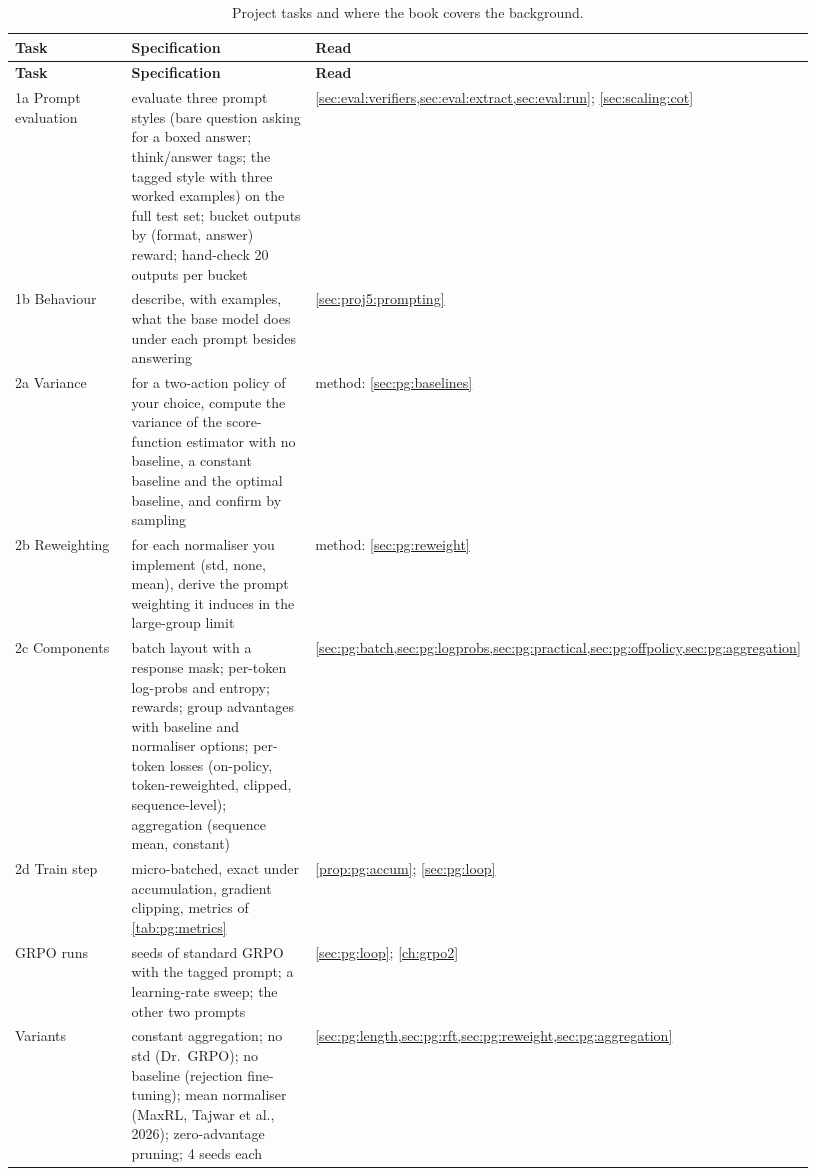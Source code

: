{\small
\begin{longtable}{@{}>{\raggedright\arraybackslash}p{0.22\linewidth}>{\raggedright\arraybackslash}p{0.44\linewidth}>{\raggedright\arraybackslash}p{0.27\linewidth}@{}}
\caption{Project tasks and where the book covers the background.}\label{tab:proj5:map}\\
\toprule
\textbf{Task} & \textbf{Specification} & \textbf{Read}\\
\midrule\endfirsthead
\toprule
\textbf{Task} & \textbf{Specification} & \textbf{Read}\\
\midrule\endhead
1a Prompt evaluation & evaluate three prompt styles (bare question asking for a boxed answer; think/answer tags; the tagged style with three worked examples) on the full test set; bucket outputs by (format, answer) reward; hand-check 20 outputs per bucket & \cref{sec:eval:verifiers,sec:eval:extract,sec:eval:run}; \cref{sec:scaling:cot}\\
1b Behaviour & describe, with examples, what the base model does under each prompt besides answering & \cref{sec:proj5:prompting}\\
2a Variance & for a two-action policy of your choice, compute the variance of the score-function estimator with no baseline, a constant baseline and the optimal baseline, and confirm by sampling & method: \cref{sec:pg:baselines}\\
2b Reweighting & for each normaliser you implement (std, none, mean), derive the prompt weighting it induces in the large-group limit & method: \cref{sec:pg:reweight}\\
2c Components & batch layout with a response mask; per-token log-probs and entropy; rewards; group advantages with baseline and normaliser options; per-token losses (on-policy, token-reweighted, clipped, sequence-level); aggregation (sequence mean, constant) & \cref{sec:pg:batch,sec:pg:logprobs,sec:pg:practical,sec:pg:offpolicy,sec:pg:aggregation}\\
2d Train step & micro-batched, exact under accumulation, gradient clipping, metrics of \cref{tab:pg:metrics} & \cref{prop:pg:accum}; \cref{sec:pg:loop}\\
3 GRPO runs & 4 seeds of standard GRPO with the tagged prompt; a learning-rate sweep; the other two prompts & \cref{sec:pg:loop}; \cref{ch:grpo2}\\
4 Variants & constant aggregation; no std (Dr.\ GRPO); no baseline (rejection fine-tuning); mean normaliser (MaxRL, Tajwar et al., 2026); zero-advantage pruning; 4 seeds each & \cref{sec:pg:length,sec:pg:rft,sec:pg:reweight,sec:pg:aggregation}\\

\end{longtable}}

